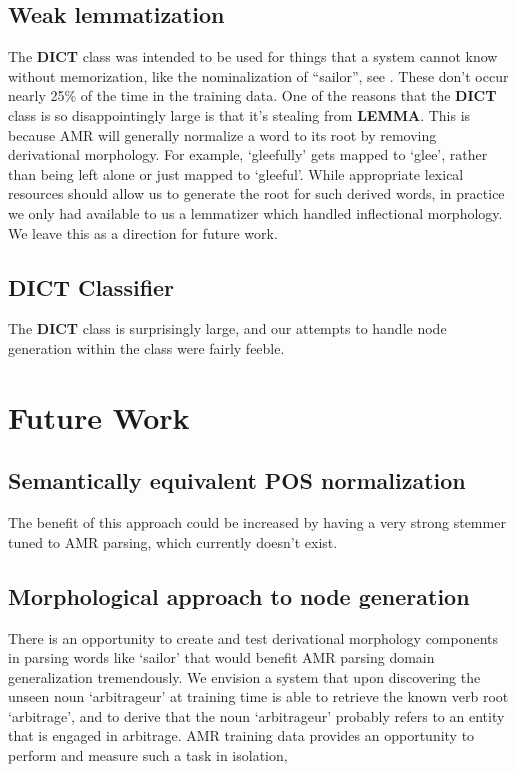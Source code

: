 \documentclass[11pt]{article}
\begin{document}
\subsection{Weak lemmatization}

The \textbf{DICT} class was intended to be used for things that a system cannot know without memorization, like the nominalization of ``sailor'', see . These don't occur nearly 25\% of the time in the training data. One of the reasons that the \textbf{DICT} class is so disappointingly large is that it's stealing from \textbf{LEMMA}. This is because AMR will generally normalize a word to its root by removing derivational morphology. For example, `gleefully' gets mapped to `glee', rather than being left alone or just mapped to `gleeful'. While appropriate lexical resources should allow us to generate the root for such derived words, in practice we only had available to us a lemmatizer which handled inflectional morphology. We leave this as a direction for future work.

\subsection{DICT Classifier}

The \textbf{DICT} class is surprisingly large, and our attempts to handle node generation within the class were fairly feeble.

\section{Future Work}
\subsection{Semantically equivalent POS normalization}
The benefit of this approach could be increased by having a very strong stemmer tuned to AMR parsing, which currently doesn't exist.

\subsection{Morphological approach to node generation}
There is an opportunity to create and test derivational morphology components in parsing words like `sailor' that would benefit AMR parsing domain generalization tremendously. We envision a system that upon discovering the unseen noun `arbitrageur' at training time is able to retrieve the known verb root `arbitrage', and to derive that the noun `arbitrageur' probably refers to an entity that is engaged in arbitrage. AMR training data provides an opportunity to perform and measure such a task in isolation, 
\end{document}
